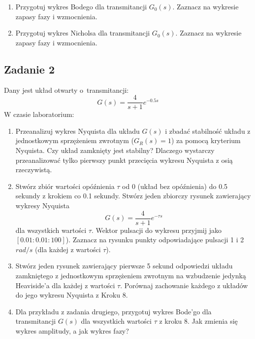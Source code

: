\documentclass{sprawozdanie-agh}
\begin{document}
\begin{enumerate}
        Podpowiedź: skorzystaj z funkcji
        \begin{lstlisting}
            [re,im,wout] = nyquist(sys,w);
        \end{lstlisting}
    
    \item[Krok 5]
            Przygotuj wykres Bodego dla transmitancji $G_0(s)$. Zaznacz na wykresie zapasy fazy i wzmocnienia.
    \item[Krok 6*]        
            Przygotuj wykres Nicholsa dla transmitancji $G_0(s)$. Zaznacz na wykresie zapasy fazy i wzmocnienia.
    
    \end{enumerate}

\subsection{Zadanie 2}
    Dany jest układ otwarty o~transmitancji:
    \begin{equation}
        G(s) = \frac{4}{s+1}e^{-0.5s}
    \end{equation}
    W czasie laboratorium:
    \begin{enumerate}
        \item[Krok 7] Przeanalizuj wykres Nyquista dla układu $G(s)$ i zbadać stabilność układu z jednostkowym sprzężeniem zwrotnym ($G_R(s) = 1$) za pomocą kryterium Nyquista. Czy układ zamknięty jest stabilny? Dlaczego wystarczy przeanalizować tylko pierwszy punkt przecięcia wykresu Nyquista z osią rzeczywistą. 

        \item[Krok 8] Stwórz zbiór wartości opóźnienia $\tau$ od 0 (układ bez opóźnienia) do 0.5 sekundy z krokiem co 0.1 sekundy. Stwórz jeden zbiorczy rysunek zawierający wykresy Nyquista  
            \begin{equation} 
            G(s) = \frac{4}{s+1}e^{-\tau s}
            \end{equation}
        dla wszystkich wartości $\tau$. Wektor pulsacji do wykresu przyjmij jako $[0.01:0.01:100]$). Zaznacz na rysunku punkty odpowiadające pulsacji 1 i 2 $rad/s$ (dla każdej z wartości $\tau$).

        \item[Krok 9]
            Stwórz jeden rysunek zawierający pierwsze 5 sekund odpowiedzi układu zamkniętego z jednostkowym sprzężeniem zwrotnym na wzbudzenie jedynką Heaviside'a dla każdej z wartości $\tau$. Porównaj zachowanie każdego z układów do jego wykresu Nyquista z Kroku 8.
            
        \item[Krok 10]
            Dla przykładu z zadania drugiego, przygotuj wykres Bode'go dla transmitancji $G(s)$ dla wszystkich wartości $\tau$ z kroku 8. Jak zmienia się wykres amplitudy, a jak wykres fazy?
    \end{enumerate}
\end{document}
